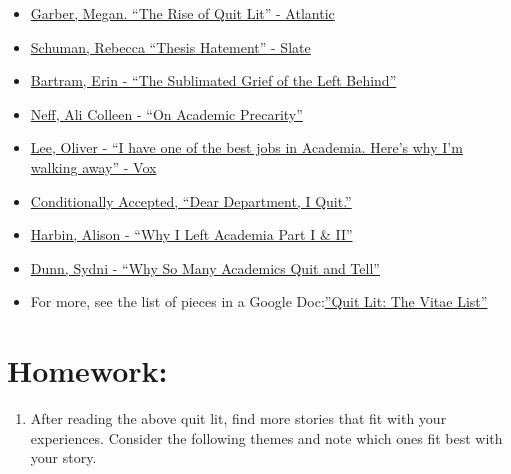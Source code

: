\documentclass[]{book}
\providecommand{\tightlist}{%
  \setlength{\itemsep}{0pt}\setlength{\parskip}{0pt}}
\begin{document}
\begin{itemize}
\tightlist
\item
  \href{https://www.theatlantic.com/entertainment/archive/2015/09/dont-quit-your-day-job/404671/}{Garber,
  Megan. ``The Rise of Quit Lit'' - Atlantic}
\item
  \href{http://www.slate.com/articles/life/culturebox/2013/04/there_are_no_academic_jobs_and_getting_a_ph_d_will_make_you_into_a_horrible.html}{Schuman,
  Rebecca ``Thesis Hatement'' - Slate}
\item
  \href{http://erinbartram.com/uncategorized/the-sublimated-grief-of-the-left-behind/}{Bartram,
  Erin - ``The Sublimated Grief of the Left Behind''}
\item
  \href{http://www.alicolleenneff.com/blog/2017/11/8/on-academic-precarity}{Neff,
  Ali Colleen - ``On Academic Precarity''}
\item
  \href{\%20https://www.vox.com/2015/9/8/9261531/professor-quitting-job}{Lee,
  Oliver - ``I have one of the best jobs in Academia. Here's why I'm
  walking away'' - Vox}
\item
  \href{\%20https://conditionallyaccepted.com/2015/06/16/quit/}{Conditionally
  Accepted, ``Dear Department, I Quit.''}
\item
  \href{\%20https://www.allisonharbin.com/post-phd/why-i-left-academia-part-1}{Harbin,
  Alison - ``Why I Left Academia Part I \& II''}
\item
  \href{https://chroniclevitae.com/news/216-why-so-many-academics-quit-and-tell}{Dunn,
  Sydni - ``Why So Many Academics Quit and Tell''}
\item
  For more, see the list of pieces in a Google
  Doc:\href{\%20https://docs.google.com/spreadsheets/d/1OODoiZKeAtiGiI3IAONCspryCHWo5Yw9xkQzkRntuMU/edit\#gid=0}{''Quit
  Lit: The Vitae List''}
\end{itemize}

\section{Homework:}\label{homework}

\begin{enumerate}
\def\labelenumi{\arabic{enumi}.}
\tightlist
\item
  After reading the above quit lit, find more stories that fit with your
  experiences. Consider the following themes and note which ones fit
  best with your story.
\end{enumerate}
\end{document}
